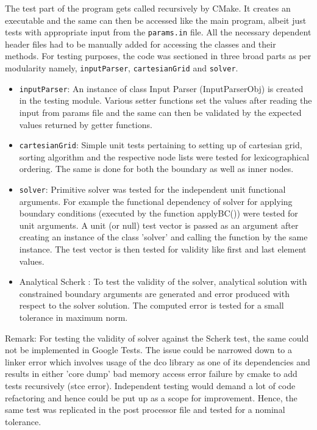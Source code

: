 \documentclass[11pt]{scrartcl}
\begin{document}
The test part of the program gets called recursively by CMake. It creates an executable and the same can then be accessed like the main program, albeit just tests with appropriate input from the \texttt{params.in} file. All the necessary dependent header files  had to be manually added for accessing the classes and their methods.
For testing purposes, the code was sectioned in three broad parts as per modularity namely, \texttt{inputParser}, \texttt{cartesianGrid} and \texttt{solver}.  
\begin{itemize}
  \item \texttt{inputParser}: An instance of class Input Parser (InputParserObj) is created in the testing module. Various setter functions set the values after reading the input from params file and the same can then be validated by the expected values returned by getter functions.
  \item \texttt{cartesianGrid}: Simple unit tests pertaining to setting up of cartesian grid, sorting algorithm and the respective node lists were tested for lexicographical ordering. The same is done for both the boundary as well as inner nodes.
 \item \texttt{solver}: Primitive solver was tested for the independent unit functional arguments. For example the functional dependency of solver for applying boundary conditions (executed by the function applyBC()) were tested for unit arguments. A unit (or null) test vector is passed as an argument after creating an instance of the class 'solver' and calling the function by the same instance. The test vector is then tested for validity like first and last element  values.  
 \item Analytical Scherk : To test the validity of the solver, analytical solution with constrained boundary arguments are generated and error produced with respect to the solver solution. The computed error is tested for a small tolerance in maximum norm.
\end{itemize}

Remark: For testing the validity of solver against the Scherk test, the same could not be implemented in Google Tests. The issue could be narrowed down to a linker error which involves usage of the dco library as one of its dependencies and results in either 'core dump' bad memory access error failure by cmake to add tests recursively (stce error). Independent testing would demand a lot of code refactoring and hence could be put up as a scope for improvement. Hence, the same test was replicated in the post processor file and tested for a nominal tolerance.
\end{document}
